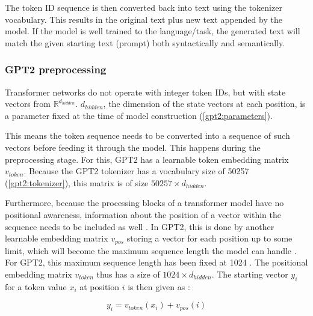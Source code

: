 The token ID sequence is then converted back into text using the tokenizer vocabulary. This results in the original text plus new text appended by the model. If the model is well trained to the language/task, the generated text will match the given starting text (prompt) both syntactically and semantically.

\subsubsection{GPT2 preprocessing}


Transformer networks do not operate with integer token IDs, but with state vectors from $\mathbb{R}^{d_{hidden}}$. $d_{hidden}$, the dimension of the state vectors at each position, is a parameter fixed at the time of model construction (\ref{gpt2:parameters}).

This means the token sequence needs to be converted into a sequence of such vectors before feeding it through the model. This happens during the preprocessing stage.
For this, GPT2 has a learnable token embedding matrix $v_{token}$.  Because the GPT2 tokenizer has a vocabulary size of 50257 (\ref{gpt2:tokenizer}), this matrix is of size $50257 \times d_{hidden}$.

\begin{samepage}

Furthermore, because the processing blocks of a transformer model have no positional awareness, information about the position of a vector within the sequence needs to be included as well .
In GPT2, this is done by another learnable embedding matrix $v_{pos}$ storing a vector for each position up to some limit, which will become the maximum sequence length the model can handle   . For GPT2, this maximum sequence length has been fixed at 1024  \cite{HuggingFaceGPT2}.
The positional embedding matrix $v_{token}$ thus has a size of $1024 \times d_{hidden}$.
The starting vector $y_i$ for a token value $x_i$ at position $i$ is then given as :

$$y_i = v_{token}(x_i) + v_{pos}(i)$$

\end{samepage}


